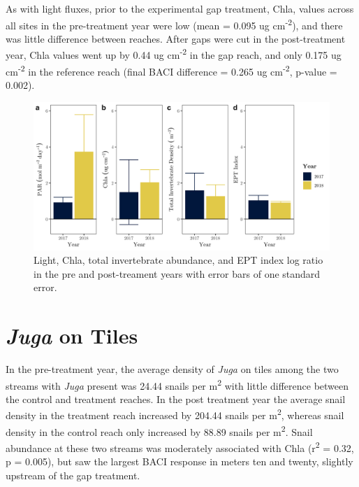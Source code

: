 \documentclass[double,12pt]{beavtex}
\begin{document}
  As with light fluxes, prior to the experimental gap treatment, Chla,
  values across all sites in the pre-treatment year were low (mean = 0.095
  ug cm\textsuperscript{-2}), and there was little difference between
  reaches. After gaps were cut in the post-treatment year, Chla values
  went up by 0.44 ug cm\textsuperscript{-2} in the gap reach, and only
  0.175 ug cm\textsuperscript{-2} in the reference reach (final BACI
  difference = 0.265 ug cm\textsuperscript{-2}, p-value = 0.002).
  
  \begin{figure}
  
  {\centering \includegraphics[width=1\linewidth]{Figures/Vars_Reach_rat} 
  
  }
  
  \caption[Light, Chla, total invertebrate abundance, and EPT index log ratio in the pre and post-treament years with error bars of one standard error]{Light, Chla, total invertebrate abundance, and EPT index log ratio in the pre and post-treament years with error bars of one standard error. \label{Exp-vars-rat}}\label{fig:unnamed-chunk-2}
  \end{figure}
  
  \section*{\texorpdfstring{\emph{Juga} on
  Tiles}{Juga on Tiles}}\label{juga-on-tiles}
  
  In the pre-treatment year, the average density of \emph{Juga} on tiles
  among the two streams with \emph{Juga} present was 24.44 snails per
  m\textsuperscript{2} with little difference between the control and
  treatment reaches. In the post treatment year the average snail density
  in the treatment reach increased by 204.44 snails per
  m\textsuperscript{2}, whereas snail density in the control reach only
  increased by 88.89 snails per m\textsuperscript{2}. Snail abundance at
  these two streams was moderately associated with Chla
  (r\textsuperscript{2} = 0.32, p = 0.005), but saw the largest BACI
  response in meters ten and twenty, slightly upstream of the gap
  treatment.
  
\end{document}
